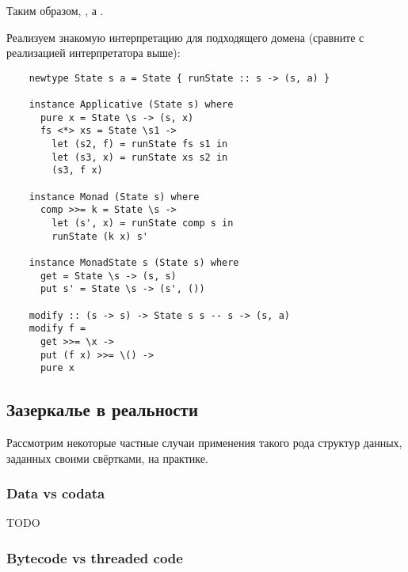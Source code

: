 Таким образом, , а .

Реализуем знакомую интерпретацию для подходящего домена (сравните с реализацией интерпретатора выше):
\begin{verbatim}
    newtype State s a = State { runState :: s -> (s, a) }

    instance Applicative (State s) where
      pure x = State \s -> (s, x)
      fs <*> xs = State \s1 ->
        let (s2, f) = runState fs s1 in
        let (s3, x) = runState xs s2 in
        (s3, f x)

    instance Monad (State s) where
      comp >>= k = State \s ->
        let (s', x) = runState comp s in
        runState (k x) s'

    instance MonadState s (State s) where
      get = State \s -> (s, s)
      put s' = State \s -> (s', ())

    modify :: (s -> s) -> State s s -- s -> (s, a)
    modify f =
      get >>= \x ->
      put (f x) >>= \() ->
      pure x
\end{verbatim}


\subsection{Зазеркалье в реальности}

Рассмотрим некоторые частные случаи применения такого рода структур данных, заданных своими свёртками, на практике.













\subsubsection{Data vs codata} \label{subsubsec:codata}


TODO %

\subsubsection{Bytecode vs threaded code} \label{subsubsec:threaded-code}

